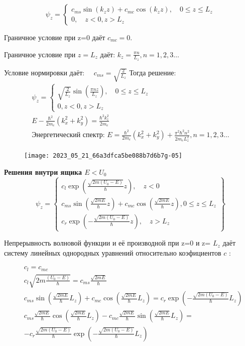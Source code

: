 $$
\psi_{z}=\left\{\begin{array}{c}
c_{m s} \sin \left(k_{z} z\right)+c_{m c} \cos \left(k_{z} z\right), \quad 0 \leq z \leq L_{z} \\
0, \quad z<0, z>L_{z}
\end{array}\right.
$$

Граничное условие при z=0 даёт $c_{m c}=0$. 

Граничное условие при $z=L_{z}$ даёт:
$
k_{z}=\frac{\pi n}{L_{z}}, n=1,2,3 \ldots
$

Условие нормировки даёт: $\quad c_{m s}=\sqrt{\frac{2}{L_{z}}}$
Тогда решение:
$$
\begin{gathered}
\psi_{z}=\left\{\begin{array}{c}
\sqrt{\frac{2}{L_{z}}} \sin \left(\frac{\pi n z}{L_{z}}\right), \quad 0 \leq z \leq L_{z} \\
0, z<0, z>L_{z}
\end{array}\right. \\
E-\frac{\hbar^{2}}{2 m_{e}}\left(k_{x}^{2}+k_{y}^{2}\right)=\frac{\hbar^{2} k_{z}^{2}}{2 m_{e}} \quad \\
\text{Энергетический спектр: }E=\frac{\hbar^{2}}{2 m_{e}}\left(k_{x}^{2}+k_{y}^{2}\right)+\frac{\pi^{2} \hbar^{2} n^{2}}{2 m_{e} L_{z}^{2}}, n=1,2,3 \ldots
\end{gathered}
$$
\begin{figure} [h!]
    \centering
    \texttt{[image: 2023\_05\_21\_66a3dfca5be088b7d6b7g-05]}
\end{figure}


\textbf{Решения внутри ящика $E<U_{0}$}
$$
\psi_{z}=\left\{\begin{array}{c}
c_{l} \exp \left(\frac{\sqrt{2 m\left(U_{0}-E\right)}}{\hbar} z\right), \quad z<0 \\
c_{m s} \sin \left(\frac{\sqrt{2 m E}}{\hbar} z\right)+c_{m c} \cos \left(\frac{\sqrt{2 m E}}{\hbar} z\right), 0 \leq z \leq L_{z} \\
c_{r} \exp \left(-\frac{\sqrt{2 m\left(U_{0}-E\right)}}{\hbar} z\right), \quad z>L_{z}
\end{array}\right\}
$$

Непрерывность волновой функции и её производной при z=0 и z= $L_{z}$ даёт систему линейных однородных уравнений относительно коэфициентов $c$ :

$$
\begin{aligned}
&c_{l}=c_{m c} \\
&c_{l} \sqrt{2 m \frac{\left(U_{0}-E\right)}{\hbar}}=c_{m s} \frac{\sqrt{2 m E}}{\hbar} \\
&c_{m s} \sin \left(\frac{\sqrt{2 m E}}{\hbar} L_{z}\right)+c_{m c} \cos \left(\frac{\sqrt{2 m E}}{\hbar} L_{z}\right)=c_{r} \exp \left(-\frac{\sqrt{2 m\left(U_{0}-E\right)}}{\hbar} L_{z}\right) \\
&c_{m s} \frac{\sqrt{2 m E}}{\hbar} \cos \left(\frac{\sqrt{2 m E}}{\hbar} L_{z}\right)-c_{m c} \frac{\sqrt{2 m E}}{\hbar} \sin \left(\frac{\sqrt{2 m E}}{\hbar} L_{z}\right)=\\
&-c_{r} \frac{\sqrt{2 m\left(U_{0}-E\right)}}{\hbar} \exp \left(-\frac{\sqrt{2 m\left(U_{0}-E\right)}}{\hbar} L_{z}\right)
\end{aligned}
$$

